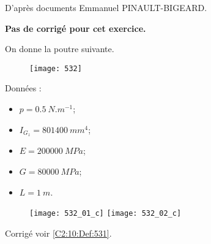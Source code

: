 \normaltrue
\correctionfalse


\setcounter{question}{0}

\begin{flushright}
\footnotesize{D'après documents Emmanuel PINAULT-BIGEARD.}
\end{flushright}


\ifcorrection
\else
\textbf{Pas de corrigé pour cet exercice.}
\fi

On donne la poutre suivante. 

\begin{figure}[H]
\centering
\texttt{[image: 532]}
\end{figure}

Données : 
\begin{itemize}
\item $p=\SI{0,5}{N.m^{-1}}$;
\item $I_{G_z} = \SI{801400}{mm^4}$;
\item $E = \SI{200000}{MPa}$;
\item $G = \SI{80000}{MPa}$;
\item $L= \SI{1}{m}$.
\end{itemize}

\ifprof
\else
\fi

\ifprof
\else
\fi

\ifprof
\else
\fi



\ifprof
\begin{figure}[H]
\centering
\texttt{[image: 532\_01\_c]}
\texttt{[image: 532\_02\_c]}
\end{figure}
\else

\begin{flushright}
\footnotesize{Corrigé  voir \ref{C2:10:Def:531}.}
\end{flushright}%
\fi